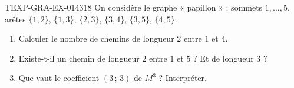 % 
% 
\begin{exercice}{TEXP-GRA-EX-014}{3}{18}
On considère le graphe « papillon » : sommets $1,\dots,5$, arêtes $\{1,2\}$,
$\{1,3\}$, $\{2,3\}$, $\{3,4\}$, $\{3,5\}$, $\{4,5\}$.
\begin{enumerate}
  \item Calculer le nombre de chemins de longueur $2$ entre $1$ et $4$.
  \item Existe-t-il un chemin de longueur $2$ entre $1$ et $5$ ? Et de
        longueur $3$ ?
  \item Que vaut le coefficient $(3\,;\,3)$ de $M^3$ ? Interpréter.
\end{enumerate}
\end{exercice}
